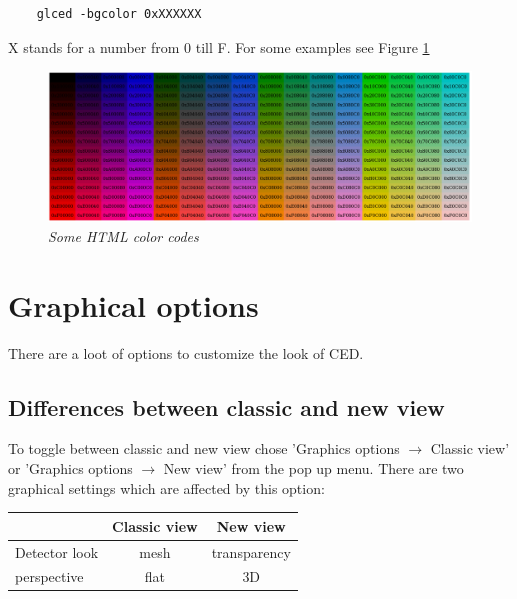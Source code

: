 \documentclass[a4paper,10pt]{article}
\begin{document}
\begin{verbatim}
	glced -bgcolor 0xXXXXXX
\end{verbatim}

X stands for a number from 0 till F.
For some examples see Figure \ref{html}
\begin{figure}[h]
\setlength{\fboxsep}{0mm}
\centerline{\includegraphics[width=1\linewidth]{html_colors1.png}}
\caption{\label{html}\textsl{Some HTML color codes}}
\end{figure}

\section{Graphical options}
There are a loot of options to customize the look of CED.

\subsection{Differences between classic and new view}
To toggle between classic and new view chose 'Graphics options $\rightarrow$ Classic view' or 'Graphics options $\rightarrow$ New view' from the pop up menu. There are two graphical settings which are affected by this option:
 \begin{center}
 \begin{tabular}[ht]{|l|c|c|}
  \hline
  &Classic view & New view\\
  \hline
  Detector look & mesh & transparency\\
  perspective & flat & 3D\\
  \hline
\end{tabular}
\end{center}
\end{document}

